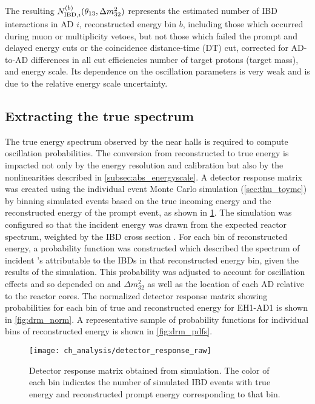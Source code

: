 The resulting $N_{\text{IBD},i}^{(b)}(\theta_{13}, \Delta m^2_{32})$ represents
the estimated number of IBD interactions in AD $i$,
reconstructed energy bin $b$,
including those which occurred during muon or multiplicity vetoes,
but not those which failed the prompt and delayed energy cuts
or the coincidence distance-time (DT) cut,
corrected for AD-to-AD differences in all cut efficiencies
number of target protons (target mass),
and energy scale.
Its dependence on the oscillation parameters
is very weak and is due to the relative energy scale uncertainty.


\subsection{Extracting the true \texorpdfstring{\nuebar{}}{antineutrino} spectrum}
\label{subsec:reco_to_true_energy}

The true \nuebar{} energy spectrum observed by the near halls
is required to compute oscillation probabilities.
The conversion from reconstructed to true energy
is impacted not only by the energy resolution and calibration
but also by the nonlinearities described in \cref{subsec:abs_energyscale}.
A detector response matrix was created
using the individual event Monte Carlo simulation (\cref{sec:thu_toymc})
by binning simulated events based on the true incoming \nuebar{} energy
and the reconstructed energy of the prompt event,
as shown in \cref{fig:drm}.
The simulation was configured so that the incident \nuebar{} energy
was drawn from the expected reactor \nuebar{} spectrum,
weighted by the IBD cross section \cite{ibd_xsec,ibd_xsec_note}.
For each bin of reconstructed energy,
a probability function was constructed
which described the spectrum of incident \nuebar{}'s
attributable to the IBDs in that reconstructed energy bin,
given the results of the simulation.
This probability was adjusted to account for
oscillation effects and so depended on \thetaot{} and $\Delta m^2_{32}${}
as well as the location of each AD relative to the reactor cores.
The normalized detector response matrix
showing probabilities for each bin of true and reconstructed energy for EH1-AD1
is shown in \cref{fig:drm_norm}.
A representative sample of probability functions
for individual bins of reconstructed energy
is shown in \cref{fig:drm_pdfs}.

\begin{figure}
    \centering
    \texttt{[image: ch\_analysis/detector\_response\_raw]}
    \caption[Detector response matrix]{
        Detector response matrix obtained from simulation.
        The color of each bin indicates the number of simulated IBD events
        with true \nuebar{} energy and reconstructed prompt energy
        corresponding to that bin.
    }
    \label{fig:drm}
\end{figure}

